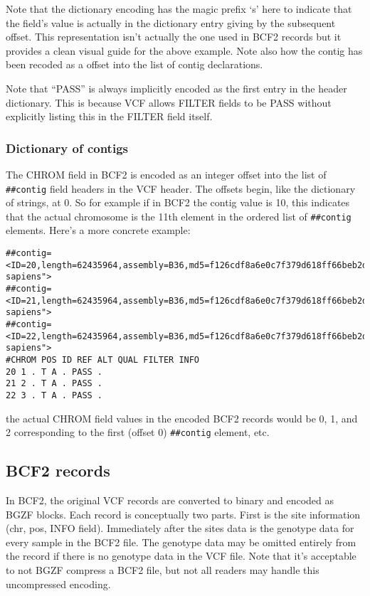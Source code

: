 \documentclass[8pt]{article}
\begin{document}
Note that the dictionary encoding has the magic prefix `s' here to indicate that the field's value is actually in the dictionary entry giving by the subsequent offset.  This representation isn't actually the one used in BCF2 records but it provides a clean visual guide for the above example.  Note also how the contig has been recoded as a offset into the list of contig declarations.

Note that ``PASS'' is always implicitly encoded as the first entry in the header dictionary.  This is because VCF allows FILTER fields to be PASS without explicitly listing this in the FILTER field itself.

\subsubsection{Dictionary of contigs}

The CHROM field in BCF2 is encoded as an integer offset into the list of \verb|##contig| field headers in the VCF header.  The offsets begin, like the dictionary of strings, at 0.  So for example if in BCF2 the contig value is 10, this indicates that the actual chromosome is the 11th element in the ordered list of \verb|##contig| elements.  Here's a more concrete example:

\small
\begin{verbatim}
##contig=<ID=20,length=62435964,assembly=B36,md5=f126cdf8a6e0c7f379d618ff66beb2da,species="Homo sapiens">
##contig=<ID=21,length=62435964,assembly=B36,md5=f126cdf8a6e0c7f379d618ff66beb2da,species="Homo sapiens">
##contig=<ID=22,length=62435964,assembly=B36,md5=f126cdf8a6e0c7f379d618ff66beb2da,species="Homo sapiens">
#CHROM POS ID REF ALT QUAL FILTER INFO
20 1 . T A . PASS .
21 2 . T A . PASS .
22 3 . T A . PASS .
\end{verbatim}
\normalsize

the actual CHROM field values in the encoded BCF2 records would be 0, 1, and 2 corresponding to the first (offset 0) \verb|##contig| element, etc.

\subsection{BCF2 records}


In BCF2, the original VCF records are converted to binary and encoded as BGZF blocks.  Each record is conceptually two parts.  First is the site information (chr, pos, INFO field).  Immediately after the sites data is the genotype data for every sample in the BCF2 file.  The genotype data may be omitted entirely from the record if there is no genotype data in the VCF file.  Note that it's acceptable to not BGZF compress a BCF2 file, but not all readers may handle this uncompressed encoding.
\end{document}
